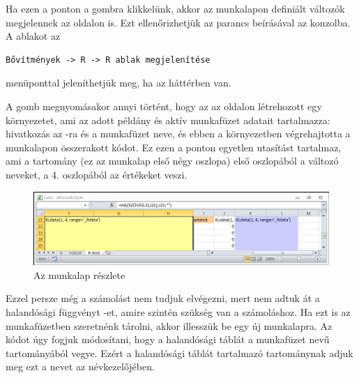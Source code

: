 Ha ezen a ponton a  gombra klikkelünk, akkor
az  munkalapon definiált változók megjelennek az 
oldalon is. Ezt ellenőrizhetjük az  parancs 
beírásával az  konzolba. A  ablakot az 
\begin{verbatim}
Bővítmények -> R -> R ablak megjelenítése
\end{verbatim}
menüponttal jeleníthetjük meg, ha az háttérben van.
A  gomb megnyomásakor annyi történt, hogy az
 az  oldalon létrehozott egy környezetet, ami az
adott  példány és aktív munkafüzet adatait tartalmazza:
hivatkozás az -ra és a munkafüzet neve, és
ebben a környezetben végrehajtotta a  munkalapon
összerakott kódot. Ez ezen a ponton egyetlen utasítást tartalmaz, ami
a  tartomány (ez az  munkalap első négy
oszlopa) első oszlopából a változó neveket, a 4. oszlopából az
értékeket veszi.  
\begin{figure}[h]
  \centering
  \includegraphics{images/R-kod}
  \caption{Az  munkalap részlete}
  \label{fig:1.3}
\end{figure}


Ezzel persze még a számolást nem tudjuk elvégezni, mert nem adtuk át a
halandósági függvényt -et, amire szintén szükség van a
számoláshoz. Ha ezt is az  munkafüzetben 
szeretnénk tárolni, akkor illesszük be egy új munkalapra. Az 
kódot úgy fogjuk módosítani, hogy a halandósági táblát a munkafüzet
 nevű tartományából vegye. Ezért a halandósági táblát
tartalmazó tartománynak adjuk meg ezt a nevet az 
névkezelőjében.

